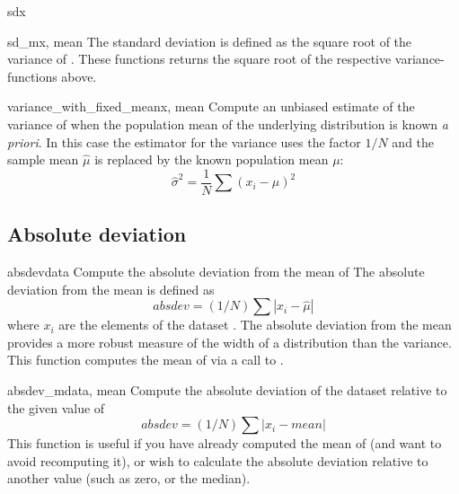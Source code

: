 \begin{funcdesc}{sd}{x}
\end{funcdesc}
\begin{funcdesc}{sd_m}{x, mean}
   The standard deviation is defined as the square root of the variance of
   .  These functions returns the square root of the respective
   variance-functions above.
\end{funcdesc}

\begin{funcdesc}{variance_with_fixed_mean}{x, mean}
   Compute an unbiased estimate of the variance of  when the population
   mean  of the underlying distribution is known \emph{a priori}.  In
   this case the estimator for the variance uses the factor $1/N$ and the
   sample mean $\hat\mu$ is replaced by the known population mean $\mu$:
   \begin{equation}
      \hat\sigma^2 = \frac{1}{N} \sum (x_i - \mu)^2
   \end{equation}
\end{funcdesc}


\subsection{Absolute deviation}
\label{sec:stat:absolute-deviation}

\begin{funcdesc}{absdev}{data}
   Compute the absolute deviation from the mean of  The absolute
   deviation from the mean is defined as
   \begin{equation}
      absdev  = (1/N) \sum |x_i - \hat\mu|
   \end{equation}
   where $x_i$ are the elements of the dataset .  The absolute
   deviation from the mean provides a more robust measure of the width of a
   distribution than the variance.  This function computes the mean of
    via a call to .
\end{funcdesc}

\begin{funcdesc}{absdev_m}{data, mean}
   Compute the absolute deviation of the dataset  relative to the
   given value of 
   \begin{equation}
      absdev  = (1/N) \sum |x_i - mean|
   \end{equation}
   This function is useful if you have already computed the mean of 
   (and want to avoid recomputing it), or wish to calculate the absolute
   deviation relative to another value (such as zero, or the median).
\end{funcdesc}


